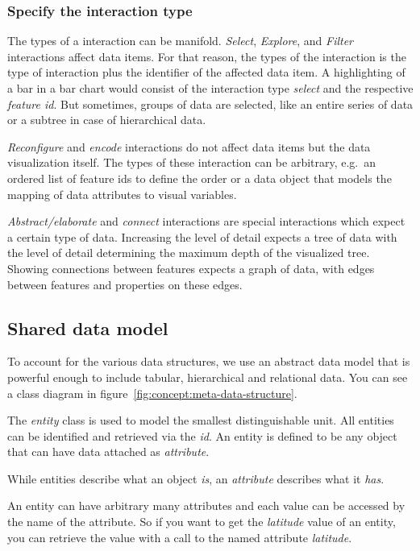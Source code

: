 \documentclass{article}
\begin{document}
\subsubsection{Specify the interaction type}

The types of a interaction can be manifold.
\emph{Select}, \emph{Explore}, and \emph{Filter} interactions affect data items.
For that reason, the types of the interaction is the type of interaction plus the identifier of the affected data item.
A highlighting of a bar in a bar chart would consist of the interaction type \emph{select} and the respective \emph{feature id}.
But sometimes, groups of data are selected, like an entire series of data or a subtree in case of hierarchical data.

\emph{\emph{Reconfigure}} and \emph{encode} interactions do not affect data items but the data visualization itself.
The types of these interaction can be arbitrary, e.g.\ an ordered list of feature ids to define the order or a data object that models the mapping of data attributes to visual variables.

\emph{Abstract/elaborate} and \emph{connect} interactions are special interactions which expect a certain type of data.
Increasing the level of detail expects a tree of data with the level of detail determining the maximum depth of the visualized tree.
Showing connections between features expects a graph of data, with edges between features and properties on these edges.


\subsection{Shared data model}\label{sec:concept:data-model}
To account for the various data structures, we use an abstract data model that is powerful enough to include tabular, hierarchical and relational data.
You can see a class diagram in figure~\ref{fig:concept:meta-data-structure}.

The \emph{entity} class is used to model the smallest distinguishable unit.
All entities can be identified and retrieved via the \emph{id}.
An entity is defined to be any object that can have data attached as \emph{attribute}.

While entities describe what an object \emph{is}, an \emph{attribute} describes what it \emph{has}.

An entity can have arbitrary many attributes and each value can be accessed by the name of the attribute.
So if you want to get the \emph{latitude} value of an entity, you can retrieve the value with a call to the named attribute \emph{latitude}.
\end{document}
